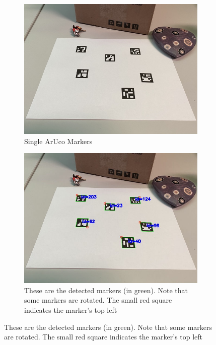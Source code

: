 \begin{figure}[ht]
    \centering
    \begin{subfigure}[t]{0.3\textwidth}
        \centering
        \includegraphics[width=\textwidth]{media/chapter 5/singlemarkersoriginal.jpg}
        \caption{Single ArUco Markers}
        \label{fig:marker}
    \end{subfigure}\hfill
    \begin{subfigure}[t]{0.3\textwidth}
        \centering
        \includegraphics[width=\textwidth]{media/chapter 5/singlemarkersdetection.jpg}
        \caption{These are the detected markers (in green). 
        Note that some markers are rotated. 
        The small red square indicates the marker’s top left 
}
\end{subfigure}
\end{figure}
